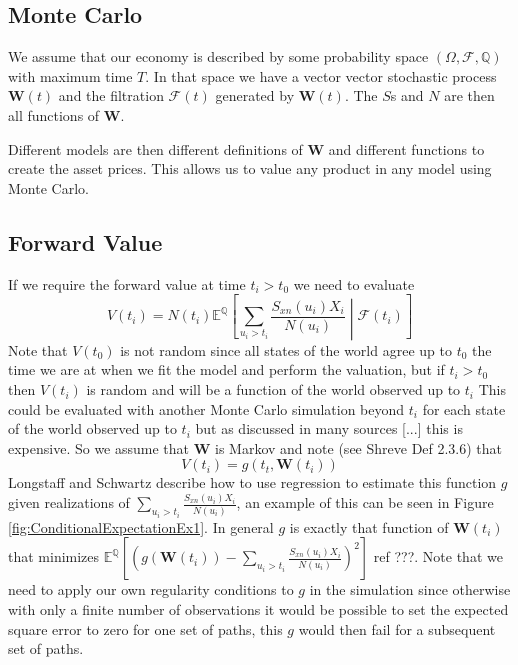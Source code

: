 \documentclass[a4paper,10pt]{article}
\newcommand{\E}{\mathbb{E}}                 %
\newcommand{\Q}{\mathbb{Q}}                 %
\begin{document}
\subsection{Monte Carlo}
We assume that our economy is described by some probability space $(\Omega, \mathcal{F}, \Q)$ with maximum time $T$.  In that space we have a vector vector stochastic process $\textbf{W}(t)$ and the filtration $\mathcal{F}(t)$ generated by $\textbf{W}(t)$.  The $S$s and $N$ are then all functions of $\textbf{W}$.

Different models are then different definitions of $\textbf{W}$ and different functions to create the asset prices.  
This allows us to value any product in any model using Monte Carlo.

\subsection{Forward Value}
If we require the forward value at time $t_i > t_0$ we need to evaluate
\begin{equation}
V(t_i) = N(t_i)\E^\Q\left[ \sum_{u_i>t_i}{\frac{S_{xn}(u_i)X_i}{N(u_i)}} \middle| \mathcal{F}(t_i) \right]
\label{eq:fwdvalue1}
\end{equation}
Note that $V(t_0)$ is not random since all states of the world agree up to $t_0$ the time we are at when we fit the model and perform the valuation, but if $t_i>t_0$ then $V(t_i)$ is random and will be a function of the world observed up to $t_i$
This could be evaluated with another Monte Carlo simulation beyond $t_i$ for each state of the world observed up to $t_i$ but as discussed in many sources [...] this is expensive.  So we assume that $\textbf{W}$ is Markov and note (see Shreve \cite{Shreve} Def 2.3.6) that 
\begin{equation}
V(t_i) = g(t_t, \textbf{W}(t_i))
\label{eq:regress}
\end{equation}
Longstaff and Schwartz \cite{Longstaff01valuingamerican} describe how to use regression to estimate this function $g$ given realizations of $\sum_{u_i>t_i}{\frac{S_{xn}(u_i)X_i}{N(u_i)}}$, an example of this can be seen in Figure \ref{fig:ConditionalExpectationEx1}.  In general $g$ is exactly that function of $\textbf{W}(t_i)$ that minimizes $\E^\Q\left[ \left(g(\textbf{W}(t_i)) - \sum_{u_i>t_i}{\frac{S_{xn}(u_i)X_i}{N(u_i)}} \right)^2 \right]$ ref ???. Note that we need to apply our own regularity conditions to $g$ in the simulation since otherwise with only a finite number of observations it would be possible to set the expected square error to zero for one set of paths, this $g$ would then fail for a subsequent set of paths.
\end{document}

